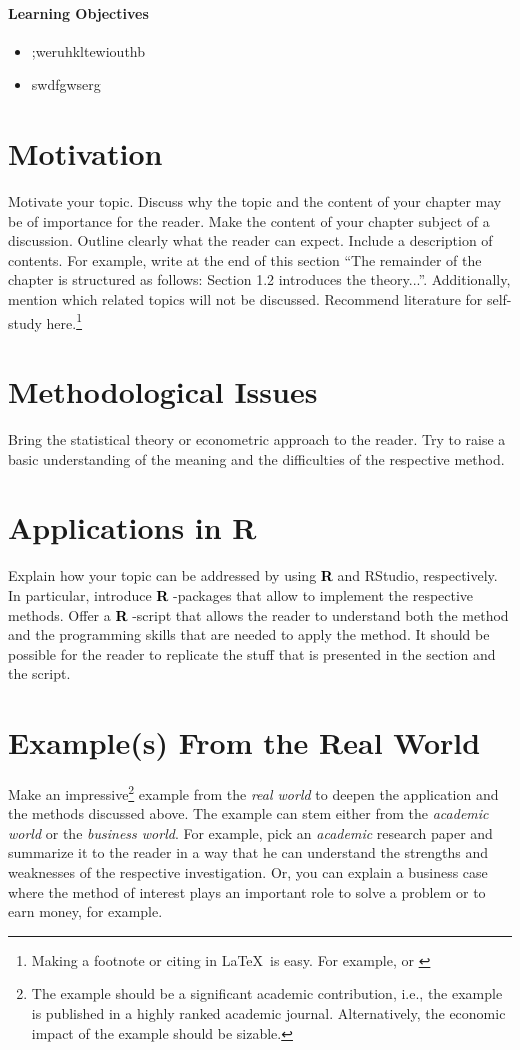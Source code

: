 \documentclass[12pt,final,a4paper,oneside]{book}
\newenvironment{goals}
{ \noindent  \paragraph*{Learning Objectives} \begin{itemize}}
	{ \end{itemize}\bigskip}
\newcommand{\R}{%
	\raisebox{.3em}{\hspace{1.2em}%
		\llap{\resizebox{1.09em}{.5em}{\color{black}$\bigcirc$}}%
		\llap{\resizebox{1.199em}{.55em}{\color{darkgray}$\bigcirc$}}%
		\llap{\resizebox{1.19em}{.52em}{\color{gray!50}$\bigcirc$}}%
		\llap{\resizebox{1.1em}{.5em}{\color{gray}$\bigcirc$}}%
		\llap{\resizebox{1.25em}{.55em}{\color{gray}$\bigcirc$}}%
	}%
	\hspace{-.85em}%
	\textbf{%
		\textcolor{black}{\textsf{R}}%
		\hspace{-.025em}\raisebox{.01em}{\llap{\textcolor{Rcolor}{\textsf{R}}}}%
	}%
	\xspace}
\begin{document}
	\begin{goals}
		\item ;weruhkltewiouthb
		\item swdfgwserg
	\end{goals}
	
	
	\section{Motivation}
	Motivate your topic. Discuss why the topic and the content of your chapter may be of importance for the reader. Make the content of your chapter subject of a discussion. Outline clearly what the reader can expect. Include a description of contents. For example, write at the end of this section ``The remainder of the chapter is structured as follows: Section 1.2 introduces the theory...''. Additionally, mention which related topics will not be discussed. Recommend literature for self-study here.\footnote{Making a footnote or citing in \LaTeX\ is easy. For example, \citet[see][p. XY]{Provost2013Data} or \citep{Provost2013Data}}
	
	\section{Methodological Issues}
	Bring the statistical theory or econometric approach to the reader. Try to raise a basic understanding of the meaning and the difficulties of the respective method. 
	
	\section{Applications in R}\label{sec:applicationsinR}
	Explain how your topic can be addressed by using \R and RStudio, respectively. In particular, introduce \R-packages that allow to implement the respective methods. Offer a \R-script that allows the reader to understand both the method and the programming skills that are needed to apply the method. It should be possible for the reader to replicate the stuff that is presented in the section and the script.
	
	\section{Example(s) From the Real World}\label{sec:examplerealworld}
	Make an impressive\footnote{The example should be a significant academic contribution, i.e., the example is published in a highly ranked academic journal. Alternatively, the economic impact of the example should be sizable.} example from the \textit{real world} to deepen the application and the methods discussed above. The example can stem either from the \textit{academic world} or the \textit{business world}. For example, pick an \textit{academic} research paper and summarize it to the reader in a way that he can understand the strengths and weaknesses of the respective investigation. Or, you can explain a business case where the method of interest plays an important role to solve a problem or to earn money, for example. 
	
\end{document}
